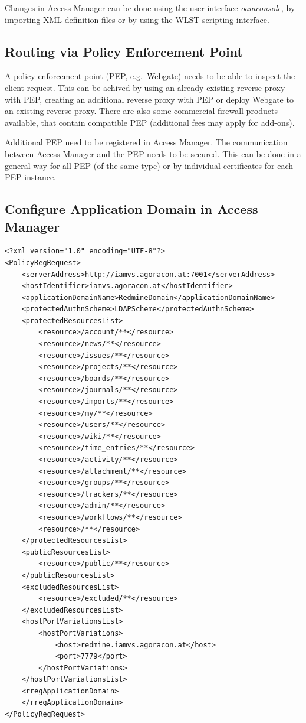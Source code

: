 \documentclass[11pt]{report}
\begin{document}
Changes in Access Manager can be done using the user interface
\emph{oamconsole}, by importing XML definition files or by using the WLST
scripting interface.


\subsection{Routing via Policy Enforcement Point}

A policy enforcement point (PEP, e.g.\ Webgate) needs to be able to inspect the
client request.  This can be achived by using an already existing reverse proxy
with PEP, creating an additional reverse proxy with PEP or deploy Webgate to an
existing reverse proxy.  There are also some commercial firewall products
available, that contain compatible PEP (additional fees may apply for add-ons).\@

Additional PEP need to be registered in Access Manager.  The communication
between Access Manager and the PEP needs to be secured.  This can be done in a
general way for all PEP (of the same type) or by individual certificates for
each PEP instance.


\subsection{Configure Application Domain in Access Manager}


\begin{Verbatim}[label=Register Application Domain]
<?xml version="1.0" encoding="UTF-8"?>
<PolicyRegRequest>
    <serverAddress>http://iamvs.agoracon.at:7001</serverAddress>
    <hostIdentifier>iamvs.agoracon.at</hostIdentifier>
    <applicationDomainName>RedmineDomain</applicationDomainName>
    <protectedAuthnScheme>LDAPScheme</protectedAuthnScheme>
    <protectedResourcesList>
        <resource>/account/**</resource>
        <resource>/news/**</resource>
        <resource>/issues/**</resource>
        <resource>/projects/**</resource>
        <resource>/boards/**</resource>
        <resource>/journals/**</resource>
        <resource>/imports/**</resource>
        <resource>/my/**</resource>
        <resource>/users/**</resource>
        <resource>/wiki/**</resource>
        <resource>/time_entries/**</resource>
        <resource>/activity/**</resource>
        <resource>/attachment/**</resource>
        <resource>/groups/**</resource>
        <resource>/trackers/**</resource>
        <resource>/admin/**</resource>
        <resource>/workflows/**</resource>
        <resource>/**</resource>
    </protectedResourcesList>
    <publicResourcesList>
        <resource>/public/**</resource>
    </publicResourcesList>
    <excludedResourcesList>
        <resource>/excluded/**</resource>
    </excludedResourcesList>
    <hostPortVariationsList>
        <hostPortVariations>
            <host>redmine.iamvs.agoracon.at</host>
            <port>7779</port>
        </hostPortVariations>
    </hostPortVariationsList>
    <rregApplicationDomain>
    </rregApplicationDomain>
</PolicyRegRequest>
\end{Verbatim}
\end{document}
